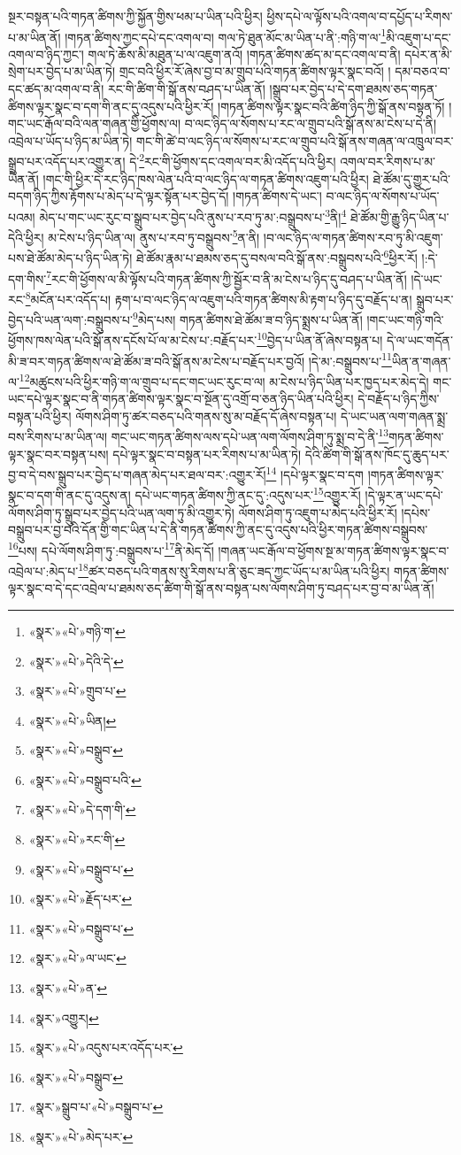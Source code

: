 སྔར་བསྟན་པའི་གཏན་ཚིགས་ཀྱི་སྐྱོན་གྱིས་ཕམ་པ་ཡིན་པའི་ཕྱིར། ཕྱིས་དཔེ་ལ་ལྟོས་པའི་འགལ་བ་དཔྱོད་པ་རིགས་པ་མ་ཡིན་ནོ། །གཏན་ཚིགས་ཀྱང་དཔེ་དང་འགལ་བ། གལ་ཏེ་ཐུན་མོང་མ་ཡིན་པ་ནི་:གཉི་ག་ལ་\footnote{«སྣར་»«པེ་»གཉི་ག་}མི་འཇུག་པ་དང་འགལ་བ་ཉིད་ཀྱང་། གལ་ཏེ་ཆོས་མི་མཐུན་པ་ལ་འཇུག་ནའོ། །གཏན་ཚིགས་ཚད་མ་དང་འགལ་བ་ནི། དཔེར་ན་མི་སྲེག་པར་བྱེད་པ་མ་ཡིན་ཏེ། གྲང་བའི་ཕྱིར་རོ་ཞེས་བྱ་བ་མ་གྲུབ་པའི་གཏན་ཚིགས་ལྟར་སྣང་བའོ། །
དམ་བཅའ་བ་དང་ཚད་མ་འགལ་བ་ནི། རང་གི་ཚིག་གི་སྒོ་ནས་བཤད་པ་ཡིན་ནོ། །སྒྲུབ་པར་བྱེད་པ་དེ་དག་ཐམས་ཅད་གཏན་ཚིགས་ལྟར་སྣང་བ་དག་གི་ནང་དུ་འདུས་པའི་ཕྱིར་རོ། །གཏན་ཚིགས་ལྟར་སྣང་བའི་ཚིག་ཉིད་ཀྱི་སྒོ་ནས་བསྟན་ཏོ། །གང་ཡང་རྒོལ་བའི་ལན་གཞན་གྱི་ཕྱོགས་ལ། བ་ལང་ཉིད་ལ་སོགས་པ་རང་ལ་གྲུབ་པའི་སྒོ་ནས་མ་ངེས་པ་དེ་ནི། འབྲེལ་པ་ཡོད་པ་ཉིད་མ་ཡིན་ཏེ། གང་གི་ཚེ་བ་ལང་ཉིད་ལ་སོགས་པ་རང་ལ་གྲུབ་པའི་སྒོ་ནས་གཞན་ལ་འཁྲུལ་བར་སྒྲུབ་པར་འདོད་པར་འགྱུར་ན། དེ་\footnote{«སྣར་»«པེ་»དེའི་དེ་}རང་གི་ཕྱོགས་དང་འགལ་བར་མི་འདོད་པའི་ཕྱིར། འགལ་བར་རིགས་པ་མ་ཡིན་ནོ། །གང་གི་ཕྱིར་དེ་རང་ཉིད་ཁས་ལེན་པའི་བ་ལང་ཉིད་ལ་གཏན་ཚིགས་འཇུག་པའི་ཕྱིར། ཐེ་ཚོམ་དུ་གྱུར་པའི་བདག་ཉིད་ཀྱིས་རྟོགས་པ་མེད་པ་དེ་ལྟར་སྟོན་པར་བྱེད་དོ། །གཏན་ཚིགས་དེ་ཡང་། བ་ལང་ཉིད་ལ་སོགས་པ་ཡོད་པའམ། མེད་པ་གང་ཡང་རུང་བ་སྒྲུབ་པར་བྱེད་པའི་ནུས་པ་རབ་ཏུ་མ་:བསྒྲུབས་པ་\footnote{«སྣར་»«པེ་»གྲུབ་པ་}ནི།\footnote{«སྣར་»«པེ་»ཡིན།} ཐེ་ཚོམ་གྱི་རྒྱུ་ཉིད་ཡིན་པ་དེའི་ཕྱིར། མ་ངེས་པ་ཉིད་ཡིན་ལ། ནུས་པ་རབ་ཏུ་བསྒྲུབས་\footnote{«སྣར་»«པེ་»བསྒྲུབ་}ན་ནི། །བ་ལང་ཉིད་ལ་གཏན་ཚིགས་རབ་ཏུ་མི་འཇུག་པས་ཐེ་ཚོམ་མེད་པ་ཉིད་ཡིན་ཏེ། ཐེ་ཚོམ་རྣམ་པ་ཐམས་ཅད་དུ་བསལ་བའི་སྒོ་ནས་:བསྒྲུབས་པའི་\footnote{«སྣར་»«པེ་»བསྒྲུབ་པའི་}ཕྱིར་རོ། །:དེ་དག་གིས་\footnote{«སྣར་»«པེ་»དེ་དག་གི་}རང་གི་ཕྱོགས་ལ་མི་ལྟོས་པའི་གཏན་ཚིགས་ཀྱི་སྦྱོར་བ་ནི་མ་ངེས་པ་ཉིད་དུ་བཤད་པ་ཡིན་ནོ། །དེ་ཡང་རང་\footnote{«སྣར་»«པེ་»རང་གི་}མངོན་པར་འདོད་པ། རྟག་པ་བ་ལང་ཉིད་ལ་འཇུག་པའི་གཏན་ཚིགས་མི་རྟག་པ་ཉིད་དུ་བརྗོད་པ་ན། སྒྲུབ་པར་བྱེད་པའི་ཡན་ལག་:བསྒྲུབས་པ་\footnote{«སྣར་»«པེ་»བསྒྲུབ་པ་}མེད་པས། གཏན་ཚིགས་ཐེ་ཚོམ་ཟ་བ་ཉིད་སྨྲས་པ་ཡིན་ནོ། །གང་ཡང་གཉི་གའི་ཕྱོགས་ཁས་ལེན་པའི་སྒོ་ནས་དངོས་པོ་ལ་མ་ངེས་པ་:བརྗོད་པར་\footnote{«སྣར་»«པེ་»རྗོད་པར་}བྱེད་པ་ཡིན་ནོ་ཞེས་བསྟན་པ། དེ་ལ་ཡང་གདོན་མི་ཟ་བར་གཏན་ཚིགས་ལ་ཐེ་ཚོམ་ཟ་བའི་སྒོ་ནས་མ་ངེས་པ་བརྗོད་པར་བྱའོ། །དེ་མ་:བསྒྲུབས་པ་\footnote{«སྣར་»«པེ་»བསྒྲུབ་པ་}ཡིན་ན་གཞན་ལ་\footnote{«སྣར་»«པེ་»ལ་ཡང་}མཚུངས་པའི་ཕྱིར་གཉི་ག་ལ་གྲུབ་པ་དང་གང་ཡང་རུང་བ་ལ། མ་ངེས་པ་ཉིད་ཡིན་པར་ཁྱད་པར་མེད་དེ། གང་ཡང་དཔེ་ལྟར་སྣང་བ་ནི་གཏན་ཚིགས་ལྟར་སྣང་བ་སྔོན་དུ་འགྲོ་བ་ཅན་ཉིད་ཡིན་པའི་ཕྱིར། དེ་བརྗོད་པ་ཉིད་ཀྱིས་བསྟན་པའི་ཕྱིར། ལོགས་ཤིག་ཏུ་ཚར་བཅད་པའི་གནས་སུ་མ་བརྗོད་དོ་ཞེས་བསྟན་པ། དེ་ཡང་ཡན་ལག་གཞན་སྨྲ་བས་རིགས་པ་མ་ཡིན་ལ། གང་ཡང་གཏན་ཚིགས་ལས་དཔེ་ཡན་ལག་ལོགས་ཤིག་ཏུ་སྨྲ་བ་དེ་ནི་\footnote{«སྣར་»«པེ་»ན་}གཏན་ཚིགས་ལྟར་སྣང་བར་བསྟན་པས། དཔེ་ལྟར་སྣང་བ་བསྟན་པར་རིགས་པ་མ་ཡིན་ཏེ། དེའི་ཚིག་གི་སྒོ་ནས་ཁོང་དུ་ཆུད་པར་བྱ་བ་དེ་བས་སྒྲུབ་པར་བྱེད་པ་གཞན་མེད་པར་ཐལ་བར་:འགྱུར་རོ།\footnote{«སྣར་»འགྱུར།} །དཔེ་ལྟར་སྣང་བ་དག །གཏན་ཚིགས་ལྟར་སྣང་བ་དག་གི་ནང་དུ་འདུས་ན། དཔེ་ཡང་གཏན་ཚིགས་ཀྱི་ནང་དུ་:འདུས་པར་\footnote{«སྣར་»«པེ་»འདུས་པར་འདོད་པར་}འགྱུར་རོ། །དེ་ལྟར་ན་ཡང་དཔེ་ལོགས་ཤིག་ཏུ་སྒྲུབ་པར་བྱེད་པའི་ཡན་ལག་ཏུ་མི་འགྱུར་ཏེ། ལོགས་ཤིག་ཏུ་འཇུག་པ་མེད་པའི་ཕྱིར་རོ། །དཔེས་བསྒྲུབ་པར་བྱ་བའི་དོན་གྱི་གང་ཡིན་པ་དེ་ནི་གཏན་ཚིགས་ཀྱི་ནང་དུ་འདུས་པའི་ཕྱིར་གཏན་ཚིགས་བསྒྲུབས་\footnote{«སྣར་»«པེ་»བསྒྲུབ་}པས། དཔེ་ལོགས་ཤིག་ཏུ་:བསྒྲུབས་པ་\footnote{«སྣར་»སྒྲུབ་པ་«པེ་»བསྒྲུབ་པ་}ནི་མེད་དོ། །གཞན་ཡང་རྒོལ་བ་ཕྱོགས་སྔ་མ་གཏན་ཚིགས་ལྟར་སྣང་བ་འབྲེལ་པ་:མེད་པ་\footnote{«སྣར་»«པེ་»མེད་པར་}ཚར་བཅད་པའི་གནས་སུ་རིགས་པ་ནི་ཅུང་ཟད་ཀྱང་ཡོད་པ་མ་ཡིན་པའི་ཕྱིར། གཏན་ཚིགས་ལྟར་སྣང་བ་དེ་དང་འབྲེལ་པ་ཐམས་ཅད་ཚིག་གི་སྒོ་ནས་བསྟན་པས་ལོགས་ཤིག་ཏུ་བཤད་པར་བྱ་བ་མ་ཡིན་ནོ། 